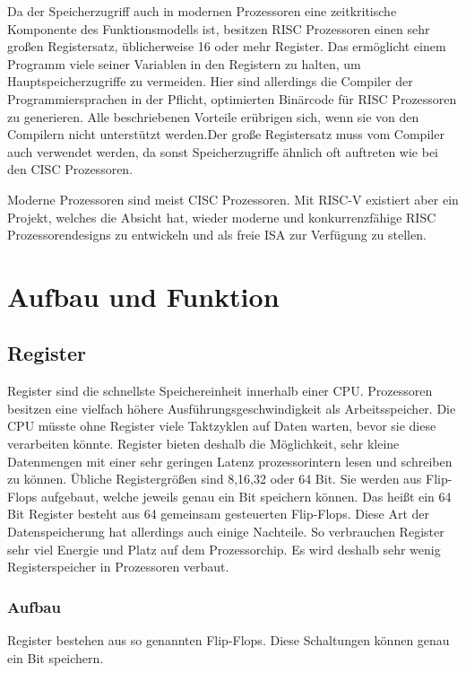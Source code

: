 \documentclass[a4paper,12pt]{article}
\begin{document}
\par \bigskip
\noindent Da der Speicherzugriff auch in modernen Prozessoren eine zeitkritische Komponente des Funktionsmodells ist, besitzen RISC Prozessoren einen sehr großen Registersatz, üblicherweise 16 oder mehr Register. Das ermöglicht einem Programm viele seiner Variablen in den Registern zu halten, um Hauptspeicherzugriffe zu vermeiden. Hier sind allerdings die Compiler der Programmiersprachen in der Pflicht, optimierten Binärcode für RISC Prozessoren zu generieren. Alle beschriebenen Vorteile erübrigen sich, wenn sie von den Compilern nicht unterstützt werden.\linebreak Der große Registersatz muss vom Compiler auch verwendet werden, da sonst Speicherzugriffe ähnlich oft auftreten wie bei den CISC Prozessoren. \cite[S.102]{mikroprozessortechnik2011}
\par \bigskip
\noindent Moderne Prozessoren sind meist CISC Prozessoren. Mit RISC-V existiert aber ein Projekt, welches die Absicht hat, wieder moderne und konkurrenzfähige RISC Prozessorendesigns zu entwickeln und als freie ISA zur Verfügung zu stellen. 

\newpage
\section{Aufbau und Funktion}
\subsection{Register} \label{sub:register}
Register sind die schnellste Speichereinheit innerhalb einer CPU. Prozessoren besitzen eine vielfach höhere Ausführungsgeschwindigkeit als Arbeitsspeicher. Die CPU müsste ohne Register viele Taktzyklen auf Daten warten, bevor sie diese verarbeiten könnte.%
 Register bieten deshalb die Möglichkeit, sehr kleine Datenmengen mit einer sehr geringen Latenz prozessorintern lesen und schreiben zu können. Übliche Registergrößen sind 8,16,32 oder 64 Bit.\cite{mikroprozessortechnik2011} Sie werden aus Flip-Flops aufgebaut, welche jeweils genau ein Bit speichern können. Das heißt ein 64 Bit Register besteht aus 64 gemeinsam gesteuerten Flip-Flops.\cite{mikroprozessortechnik2011} Diese Art der Datenspeicherung hat allerdings auch einige Nachteile. So verbrauchen Register sehr viel Energie und Platz auf dem Prozessorchip. Es wird deshalb sehr wenig Registerspeicher in Prozessoren verbaut.

\subsubsection{Aufbau}
Register bestehen aus so genannten Flip-Flops. Diese Schaltungen können genau ein Bit speichern. 
\end{document}
